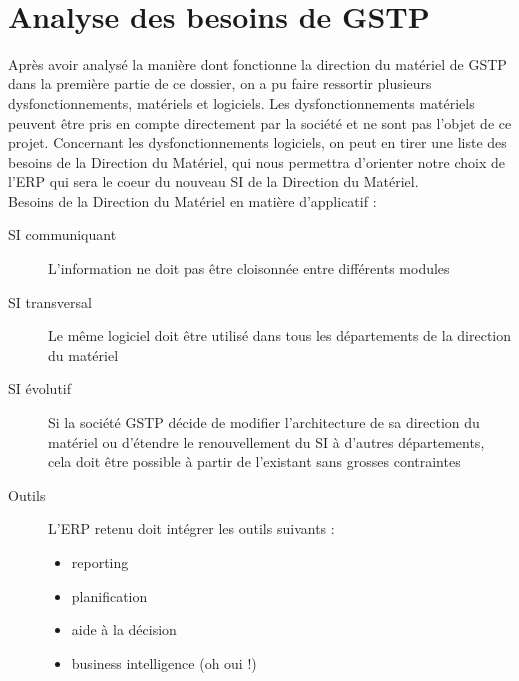 \documentclass[a4paper]{article}
\begin{document}
\maketitle

\hfill\\

\section{Analyse des besoins de GSTP}

Après avoir analysé la manière dont fonctionne la direction du matériel de
GSTP dans la première partie de ce dossier, on a pu faire ressortir
plusieurs dysfonctionnements, matériels et logiciels. Les
dysfonctionnements matériels peuvent être pris en compte directement par
la société et ne sont pas l'objet de ce projet. Concernant les
dysfonctionnements logiciels, on peut en tirer une liste des besoins de la
Direction du Matériel, qui nous permettra d'orienter notre choix de l'ERP
qui sera le coeur du nouveau SI de la Direction du Matériel.\\

Besoins de la Direction du Matériel en matière d'applicatif :

\begin{description}
\item[SI communiquant] L'information ne doit pas être cloisonnée entre
différents modules
\item[SI transversal] Le même logiciel doit être utilisé dans tous les
départements de la direction du matériel
\item[SI évolutif] Si la société GSTP décide de modifier l'architecture de
sa direction du matériel ou d'étendre le renouvellement du SI à d'autres
départements, cela doit être possible à partir de l'existant sans grosses
contraintes
\item[Outils] L'ERP retenu doit intégrer les outils suivants :
    \begin{itemize}
    \item reporting
    \item planification
    \item aide à la décision
    \item business intelligence (oh oui !)
    \end{itemize}
\end{description}
\end{document}
